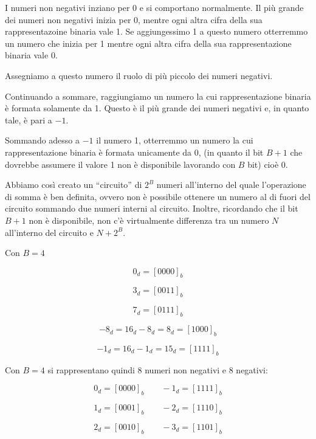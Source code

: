 \documentclass{article}
\begin{document}
I numeri non negativi inziano per 0 e si comportano normalmente. Il più grande dei numeri non negativi inizia per 0, mentre ogni altra cifra della sua rappresentazoine binaria vale 1. Se aggiungessimo 1 a questo numero otterremmo un numero che inizia per 1 mentre ogni altra cifra della sua rappresentazione binaria vale 0. 

\vspace{3mm}

Assegniamo a questo numero il ruolo di più piccolo dei numeri negativi. 

\vspace{1mm}

Continuando a sommare, raggiungiamo un numero la cui rappresentazione binaria è formata solamente da 1. Questo è il più grande dei numeri negativi e, in quanto tale, è pari a $-1$. 

\vspace{1mm}

Sommando adesso a $-1$ il numero 1, otterremmo un numero la cui rappresentazione binaria è formata unicamente da 0, (in quanto il bit $B+1$ che dovrebbe assumere il valore 1 non è disponibile lavorando con $B$ bit) cioè 0. 

\vspace{3mm}

Abbiamo così creato un ``circuito'' di $2^B$ numeri all'interno del quale l'operazione di somma è ben definita, ovvero non è possibile ottenere un numero al di fuori del circuito sommando due numeri interni al circuito. Inoltre, ricordando che il bit $B + 1$ non è disponibile, non c'è virtualmente differenza tra un numero $N$ all'interno del circuito e $N + 2^B$.

\vspace{1mm}

Con $B = 4$

\[0_d = [0000]_b\]

\[3_d = [0011]_b\]

\[7_d = [0111]_b\]

\[-8_d = 16_d - 8_d = 8_d = [1000]_b\]

\[-1_d = 16_d - 1_d = 15_d = [1111]_b\]

Con $B = 4$ si rappresentano quindi 8 numeri non negativi e 8 negativi:

\[0_d = [0000]_b\quad \quad -1_d = [1111]_b\]

\[1_d = [0001]_b\quad \quad -2_d = [1110]_b\]

\[2_d = [0010]_b\quad \quad -3_d = [1101]_b\]
\end{document}
